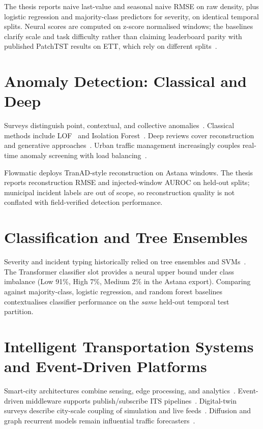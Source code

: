 The thesis reports naive last-value and seasonal naive RMSE on raw density, plus logistic regression and majority-class predictors for severity, on identical temporal splits. Neural scores are computed on z-score normalised windows; the baselines clarify scale and task difficulty rather than claiming leaderboard parity with published PatchTST results on ETT, which rely on different splits~\cite{nie2023patchtst}.

\section{Anomaly Detection: Classical and Deep}

Surveys distinguish point, contextual, and collective anomalies~\cite{chandola2009anomaly}. Classical methods include LOF~\cite{breunig2000lof} and Isolation Forest~\cite{liu2008isolation}. Deep reviews cover reconstruction and generative approaches~\cite{pang2021deep,ding2024variational,kim2024autoencoder,xu2021anomaly}. Urban traffic management increasingly couples real-time anomaly screening with load balancing~\cite{laanaoui2024realtime,wang2023federatedtrajectory}.

Flowmatic deploys TranAD-style reconstruction on Astana windows. The thesis reports reconstruction RMSE and injected-window AUROC on held-out splits; municipal incident labels are out of scope, so reconstruction quality is not conflated with field-verified detection performance.

\section{Classification and Tree Ensembles}

Severity and incident typing historically relied on tree ensembles and SVMs~\cite{breiman2001random,cortes1995svm,chen2016xgboost}. The Transformer classifier slot provides a neural upper bound under class imbalance (Low 91\%, High 7\%, Medium 2\% in the Astana export). Comparing against majority-class, logistic regression, and random forest baselines contextualises classifier performance on the \emph{same} held-out temporal test partition.

\section{Intelligent Transportation Systems and Event-Driven Platforms}

Smart-city architectures combine sensing, edge processing, and analytics~\cite{zanella2014iot,its_bigdata2018}. Event-driven middleware supports publish/subscribe ITS pipelines~\cite{event_driven2025,kreps2011kafka}. Digital-twin surveys describe city-scale coupling of simulation and live feeds~\cite{mazzetto2024urban}. Diffusion and graph recurrent models remain influential traffic forecasters~\cite{li2018diffusion,guo2019attention}.

